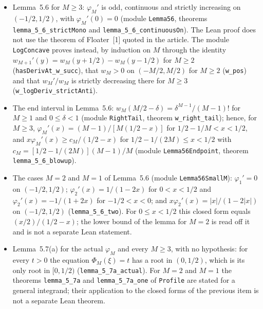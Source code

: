 \documentclass[11pt,a4paper]{article}
\begin{document}
\begin{itemize}\setlength{\itemsep}{1pt}\raggedright
\item Lemma~5.6 for $M\geq3$: $\varphi_M'$ is odd, continuous and strictly increasing on $(-1/2,1/2)$, with $\varphi_M'(0)=0$ (module \texttt{Lemma56}, theorems \texttt{lemma\_5\_6\_strictMono} and \texttt{lemma\_5\_6\_continuousOn}). The Lean proof does not use the theorem of Floater~[1] quoted in the article. The module \texttt{LogConcave} proves instead, by induction on $M$ through the identity $w_{M+1}'(y)=w_M(y+1/2)-w_M(y-1/2)$ for $M\geq2$ (\texttt{hasDerivAt\_w\_succ}), that $w_M>0$ on $(-M/2,M/2)$ for $M\geq2$ (\texttt{w\_pos}) and that $w_M'/w_M$ is strictly decreasing there for $M\geq3$ (\texttt{w\_logDeriv\_strictAnti}).
\item The end interval in Lemma~5.6: $w_M(M/2-\delta)=\delta^{M-1}/(M-1)!$ for $M\geq1$ and $0\leq\delta<1$ (module \texttt{RightTail}, theorem \texttt{w\_right\_tail}); hence, for $M\geq3$, $\varphi_M'(x)=(M-1)/[M(1/2-x)]$ for $1/2-1/M<x<1/2$, and $x\varphi_M'(x)\geq c_M/(1/2-x)$ for $1/2-1/(2M)\leq x<1/2$ with $c_M=[1/2-1/(2M)](M-1)/M$ (module \texttt{Lemma56Endpoint}, theorem \texttt{lemma\_5\_6\_blowup}).
\item The cases $M=2$ and $M=1$ of Lemma~5.6 (module \texttt{Lemma56SmallM}): $\varphi_1'=0$ on $(-1/2,1/2)$; $\varphi_2'(x)=1/(1-2x)$ for $0<x<1/2$ and $\varphi_2'(x)=-1/(1+2x)$ for $-1/2<x<0$; and $x\varphi_2'(x)=|x|/(1-2|x|)$ on $(-1/2,1/2)$ (\texttt{lemma\_5\_6\_two}). For $0\leq x<1/2$ this closed form equals $(x/2)/(1/2-x)$; the lower bound of the lemma for $M=2$ is read off it and is not a separate Lean statement.
\item Lemma~5.7(a) for the actual $\varphi_M$ and every $M\geq3$, with no hypothesis: for every $t>0$ the equation $\Phi_M(\xi)=t$ has a root in $(0,1/2)$, which is its only root in $[0,1/2)$ (\texttt{lemma\_5\_7a\_actual}). For $M=2$ and $M=1$ the theorems \texttt{lemma\_5\_7a} and \texttt{lemma\_5\_7a\_one} of \texttt{Profile} are stated for a general integrand; their application to the closed forms of the previous item is not a separate Lean theorem.

\end{itemize}
\end{document}
